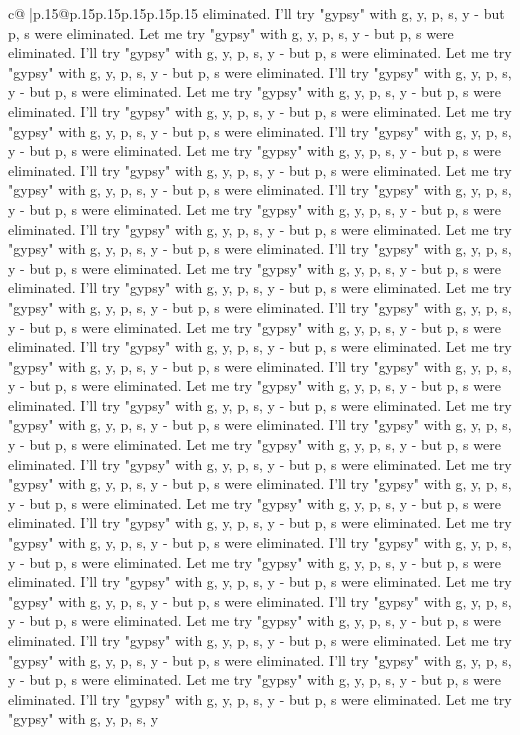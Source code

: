 \documentclass{article}
\begin{document}
{\begin{supertabular}{c@{$\;$}|p{.15\linewidth}@{}p{.15\linewidth}p{.15\linewidth}p{.15\linewidth}p{.15\linewidth}p{.15\linewidth}}
{{{eliminated. I'll try "gypsy" with g, y, p, s, y {-} but p, s were eliminated. Let me try "gypsy" with g, y, p, s, y {-} but p, s were eliminated. I'll try "gypsy" with g, y, p, s, y {-} but p, s were eliminated. Let me try "gypsy" with g, y, p, s, y {-} but p, s were eliminated. I'll try "gypsy" with g, y, p, s, y {-} but p, s were eliminated. Let me try "gypsy" with g, y, p, s, y {-} but p, s were eliminated. I'll try "gypsy" with g, y, p, s, y {-} but p, s were eliminated. Let me try "gypsy" with g, y, p, s, y {-} but p, s were eliminated. I'll try "gypsy" with g, y, p, s, y {-} but p, s were eliminated. Let me try "gypsy" with g, y, p, s, y {-} but p, s were eliminated. I'll try "gypsy" with g, y, p, s, y {-} but p, s were eliminated. Let me try "gypsy" with g, y, p, s, y {-} but p, s were eliminated. I'll try "gypsy" with g, y, p, s, y {-} but p, s were eliminated. Let me try "gypsy" with g, y, p, s, y {-} but p, s were eliminated. I'll try "gypsy" with g, y, p, s, y {-} but p, s were eliminated. Let me try "gypsy" with g, y, p, s, y {-} but p, s were eliminated. I'll try "gypsy" with g, y, p, s, y {-} but p, s were eliminated. Let me try "gypsy" with g, y, p, s, y {-} but p, s were eliminated. I'll try "gypsy" with g, y, p, s, y {-} but p, s were eliminated. Let me try "gypsy" with g, y, p, s, y {-} but p, s were eliminated. I'll try "gypsy" with g, y, p, s, y {-} but p, s were eliminated. Let me try "gypsy" with g, y, p, s, y {-} but p, s were eliminated. I'll try "gypsy" with g, y, p, s, y {-} but p, s were eliminated. Let me try "gypsy" with g, y, p, s, y {-} but p, s were eliminated. I'll try "gypsy" with g, y, p, s, y {-} but p, s were eliminated. Let me try "gypsy" with g, y, p, s, y {-} but p, s were eliminated. I'll try "gypsy" with g, y, p, s, y {-} but p, s were eliminated. Let me try "gypsy" with g, y, p, s, y {-} but p, s were eliminated. I'll try "gypsy" with g, y, p, s, y {-} but p, s were eliminated. Let me try "gypsy" with g, y, p, s, y {-} but p, s were eliminated. I'll try "gypsy" with g, y, p, s, y {-} but p, s were eliminated. Let me try "gypsy" with g, y, p, s, y {-} but p, s were eliminated. I'll try "gypsy" with g, y, p, s, y {-} but p, s were eliminated. Let me try "gypsy" with g, y, p, s, y {-} but p, s were eliminated. I'll try "gypsy" with g, y, p, s, y {-} but p, s were eliminated. Let me try "gypsy" with g, y, p, s, y {-} but p, s were eliminated. I'll try "gypsy" with g, y, p, s, y {-} but p, s were eliminated. Let me try "gypsy" with g, y, p, s, y {-} but p, s were eliminated. I'll try "gypsy" with g, y, p, s, y {-} but p, s were eliminated. Let me try "gypsy" with g, y, p, s, y {-} but p, s were eliminated. I'll try "gypsy" with g, y, p, s, y {-} but p, s were eliminated. Let me try "gypsy" with g, y, p, s, y {-} but p, s were eliminated. I'll try "gypsy" with g, y, p, s, y {-} but p, s were eliminated. Let me try "gypsy" with g, y, p, s, y {-} but p, s were eliminated. I'll try "gypsy" with g, y, p, s, y {-} but p, s were eliminated. Let me try "gypsy" with g, y, p, s, y {-} but p, s were eliminated. I'll try "gypsy" with g, y, p, s, y {-} but p, s were eliminated. Let me try "gypsy" with g, y, p, s, y }}}
\end{supertabular}}
\end{document}
